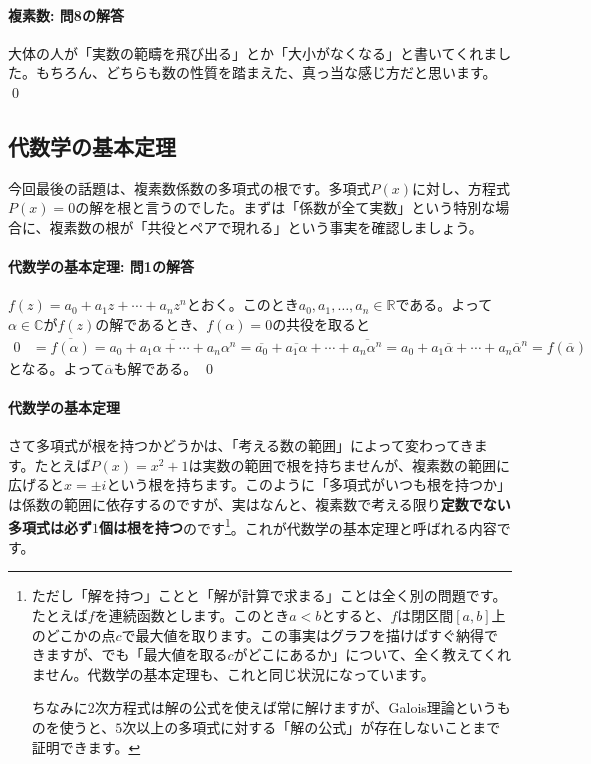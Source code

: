 \paragraph{複素数: 問8の解答}

大体の人が「実数の範疇を飛び出る」とか「大小がなくなる」と書いてくれました。もちろん、どちらも数の性質を踏まえた、真っ当な感じ方だと思います。 \qed

\subsection{代数学の基本定理}

今回最後の話題は、複素数係数の多項式の根です。多項式$P(x)$に対し、方程式$P(x)=0$の解を根と言うのでした。まずは「係数が全て実数」という特別な場合に、複素数の根が「共役とペアで現れる」という事実を確認しましょう。

\paragraph{代数学の基本定理: 問1の解答}

$f(z) = a_0 + a_1 z + \cdots + a_n z^n$とおく。このとき$a_0,a_1,\ldots,a_n\in\mathbb{R}$である。よって$\alpha\in\mathbb{C}$が$f(z)$の解であるとき、$f(\alpha)=0$の共役を取ると
\begin{align*}
0 &= \overline{f(\alpha)}
= \overline{a_0 + a_1 \alpha + \cdots + a_n \alpha^n}
= \overline{a_0} +\overline{a_1 \alpha} + \cdots + \overline{a_n \alpha^n}
= a_0 + a_1 \overline{\alpha} + \cdots + a_n \overline{\alpha}^n
= f(\overline{\alpha})
\end{align*}
となる。よって$\overline{\alpha}$も解である。 \qed

\paragraph{代数学の基本定理}

さて多項式が根を持つかどうかは、「考える数の範囲」によって変わってきます。たとえば$P(x)=x^2+1$は実数の範囲で根を持ちませんが、複素数の範囲に広げると$x=\pm i$という根を持ちます。このように「多項式がいつも根を持つか」は係数の範囲に依存するのですが、実はなんと、複素数で考える限り\textbf{定数でない多項式は必ず$1$個は根を持つ}のです\footnote{ただし「解を持つ」ことと「解が計算で求まる」ことは全く別の問題です。たとえば$f$を連続函数とします。このとき$a<b$とすると、$f$は閉区間$[a,b]$上のどこかの点$c$で最大値を取ります。この事実はグラフを描けばすぐ納得できますが、でも「最大値を取る$c$がどこにあるか」について、全く教えてくれません。代数学の基本定理も、これと同じ状況になっています。

ちなみに$2$次方程式は解の公式を使えば常に解けますが、Galois理論というものを使うと、$5$次以上の多項式に対する「解の公式」が存在しないことまで証明できます。}。これが代数学の基本定理と呼ばれる内容です。

